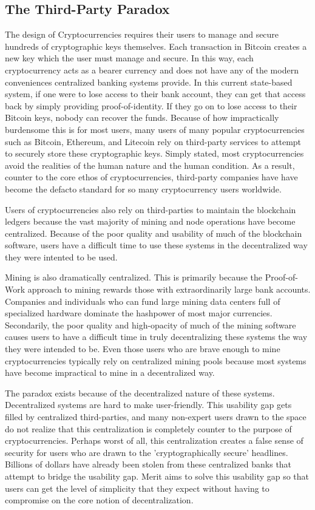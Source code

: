 \documentclass{article}
\begin{document}
\subsection{The Third-Party Paradox}

The design of Cryptocurrencies requires their users to manage and secure hundreds
of cryptographic keys themselves. Each \gls{transaction} in \gls{Bitcoin} creates a new key which the user must
manage and secure. In this way, each cryptocurrency acts as a \gls{bearer currency} and does not have any of the
modern conveniences centralized banking systems provide. In this current state-based system, 
if one were to lose access to their bank
account, they can get that access back by simply providing proof-of-identity. If they go on to lose 
access to their \gls{Bitcoin} keys, nobody can recover the funds. Because of how impractically burdensome this is for most users, 
many users of many popular cryptocurrencies such as \gls{Bitcoin}, \gls{Ethereum}, 
and \gls{Litecoin} rely on third-party services to attempt to securely store these cryptographic keys.  Simply stated, 
most cryptocurrencies avoid the realities of the human nature and the human condition.  
As a result, counter to the core ethos of cryptocurrencies, third-party companies have have become the defacto standard for so many 
cryptocurrency users worldwide.

Users of cryptocurrencies also rely on third-parties to maintain the blockchain ledgers
because the vast majority of mining and node operations have become centralized.
Because of the poor quality and usability of much of the blockchain software, users have a difficult time
to use these systems in the decentralized way they were intented to be used.  

Mining is also dramatically centralized.  This is primarily because the Proof-of-Work approach to mining rewards those with extraordinarily large bank accounts.  
Companies and individuals who can fund large mining data centers full of specialized hardware dominate the hashpower of most major currencies.  \cite{drypool}
Secondarily, the poor quality and high-opacity of much of the mining software causes users to have a difficult time
in truly decentralizing these systems the way they were intended to be. Even those users who are brave enough to mine cryptocurrencies 
typically rely on centralized mining pools
because most systems have become impractical to mine in a decentralized way.

The paradox exists because of the decentralized nature of these systems. Decentralized
systems are hard to make user-friendly. This usability gap gets filled by centralized
third-parties, and many non-expert users drawn to the space do not realize that this centralization is completely counter to the purpose of cryptocurrencies. 
Perhaps worst of all, this centralization creates a false sense of security for users who are drawn to the 'cryptographically secure' headlines.  
Billions of dollars have already been stolen from these centralized banks that attempt to bridge the usability gap.  
Merit aims to solve this usability gap so that users can get the level of simplicity that they expect without 
having to compromise on the core notion of decentralization.  
\end{document}
